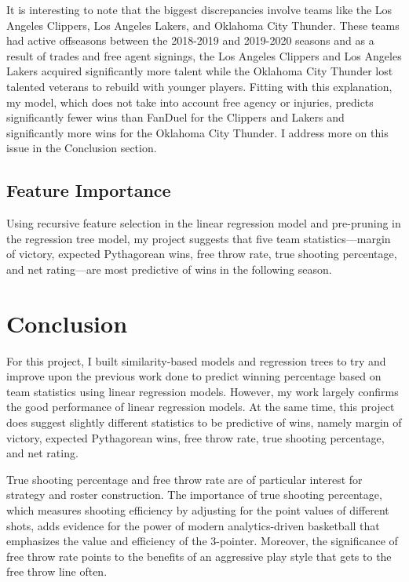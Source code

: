 \documentclass[pageno]{jpaper}
\begin{document}
It is interesting to note that the biggest discrepancies involve teams like the Los Angeles Clippers, Los Angeles Lakers, and Oklahoma City Thunder. These teams had active offseasons between the 2018-2019 and 2019-2020 seasons and as a result of trades and free agent signings, the Los Angeles Clippers and Los Angeles Lakers acquired significantly more talent while the Oklahoma City Thunder lost talented veterans to rebuild with younger players. Fitting with this explanation, my model, which does not take into account free agency or injuries, predicts significantly fewer wins than FanDuel for the Clippers and Lakers and significantly more wins for the Oklahoma City Thunder. I address more on this issue in the Conclusion section.

\subsection{Feature Importance}

Using recursive feature selection in the linear regression model and pre-pruning in the regression tree model, my project suggests that five team statistics---margin of victory, expected Pythagorean wins, free throw rate, true shooting percentage, and net rating---are most predictive of wins in the following season.

\section{Conclusion}

For this project, I built similarity-based models and regression trees to try and improve upon the previous work done to predict winning percentage based on team statistics using linear regression models. However, my work largely confirms the good performance of linear regression models. At the same time, this project does suggest slightly different statistics to be predictive of wins, namely margin of victory, expected Pythagorean wins, free throw rate, true shooting percentage, and net rating.

True shooting percentage and free throw rate are of particular interest for strategy and roster construction. The importance of true shooting percentage, which measures shooting efficiency by adjusting for the point values of different shots, adds evidence for the power of modern analytics-driven basketball that emphasizes the value and efficiency of the 3-pointer. Moreover, the significance of free throw rate points to the benefits of an aggressive play style that gets to the free throw line often.
\end{document}
